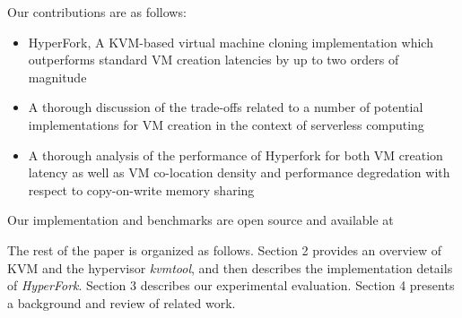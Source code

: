  Our contributions are as follows:
\begin{itemize}
\item HyperFork, A KVM-based virtual machine cloning implementation which outperforms
standard VM creation latencies by up to two orders of magnitude
\item A thorough discussion of the trade-offs related to a number of potential
implementations for VM creation in the context of serverless computing %
\item A thorough analysis of the performance of Hyperfork for both VM creation
latency as well as VM co-location density and performance degredation with
respect to copy-on-write memory sharing %
\end{itemize}

Our implementation and benchmarks are open source and available at %

The rest of the paper is organized as follows. Section 2 provides an overview of KVM and the hypervisor \emph{kvmtool}, and then describes the implementation details of \emph{HyperFork}. Section 3 describes our experimental evaluation. Section 4 presents a background and review of related work. %

